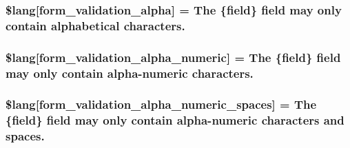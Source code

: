 \subsubsection[{\$lang}]{\setlength{\rightskip}{0pt plus 5cm}\$lang\mbox{[}\textquotesingle{}form\+\_\+validation\+\_\+alpha\textquotesingle{}\mbox{]} = \textquotesingle{}The \{field\} field may only contain alphabetical characters.\textquotesingle{}}\label{system_2language_2english_2form__validation__lang_8php_a27ff6ba34db740db678c05baa95077bf}
\hypertarget{system_2language_2english_2form__validation__lang_8php_ad76e433e4991ed7404c0d44ab47119c0}{}
\subsubsection[{\$lang}]{\setlength{\rightskip}{0pt plus 5cm}\$lang\mbox{[}\textquotesingle{}form\+\_\+validation\+\_\+alpha\+\_\+numeric\textquotesingle{}\mbox{]} = \textquotesingle{}The \{field\} field may only contain alpha-\/numeric characters.\textquotesingle{}}\label{system_2language_2english_2form__validation__lang_8php_ad76e433e4991ed7404c0d44ab47119c0}
\hypertarget{system_2language_2english_2form__validation__lang_8php_a8909b4a4c25b40e7ed1a27cc5b299d90}{}
\subsubsection[{\$lang}]{\setlength{\rightskip}{0pt plus 5cm}\$lang\mbox{[}\textquotesingle{}form\+\_\+validation\+\_\+alpha\+\_\+numeric\+\_\+spaces\textquotesingle{}\mbox{]} = \textquotesingle{}The \{field\} field may only contain alpha-\/numeric characters and spaces.\textquotesingle{}}\label{system_2language_2english_2form__validation__lang_8php_a8909b4a4c25b40e7ed1a27cc5b299d90}
\hypertarget{system_2language_2english_2form__validation__lang_8php_a95a401451435c56b9792be96ffa1bb36}{}
